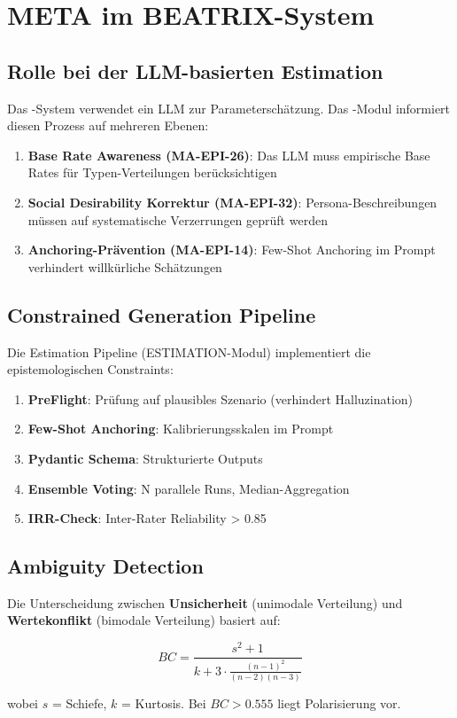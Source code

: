 \section{META im BEATRIX-System}

\subsection{Rolle bei der LLM-basierten Estimation}

Das \BEATRIX-System verwendet ein LLM zur Parameterschätzung. Das \META-Modul informiert diesen Prozess auf mehreren Ebenen:

\begin{enumerate}
    \item \textbf{Base Rate Awareness (MA-EPI-26)}: Das LLM muss empirische Base Rates für Typen-Verteilungen berücksichtigen
    \item \textbf{Social Desirability Korrektur (MA-EPI-32)}: Persona-Beschreibungen müssen auf systematische Verzerrungen geprüft werden
    \item \textbf{Anchoring-Prävention (MA-EPI-14)}: Few-Shot Anchoring im Prompt verhindert willkürliche Schätzungen
\end{enumerate}

\subsection{Constrained Generation Pipeline}

Die \BEATRIX{} Estimation Pipeline (ESTIMATION-Modul) implementiert die epistemologischen Constraints:

\begin{enumerate}
    \item \textbf{PreFlight}: Prüfung auf plausibles Szenario (verhindert Halluzination)
    \item \textbf{Few-Shot Anchoring}: Kalibrierungsskalen im Prompt
    \item \textbf{Pydantic Schema}: Strukturierte Outputs
    \item \textbf{Ensemble Voting}: N parallele Runs, Median-Aggregation
    \item \textbf{IRR-Check}: Inter-Rater Reliability > 0.85
\end{enumerate}

\subsection{Ambiguity Detection}

Die Unterscheidung zwischen \textbf{Unsicherheit} (unimodale Verteilung) und \textbf{Wertekonflikt} (bimodale Verteilung) basiert auf:

\begin{equation}
BC = \frac{s^2 + 1}{k + 3 \cdot \frac{(n-1)^2}{(n-2)(n-3)}}
\end{equation}

wobei $s$ = Schiefe, $k$ = Kurtosis. Bei $BC > 0.555$ liegt Polarisierung vor.

